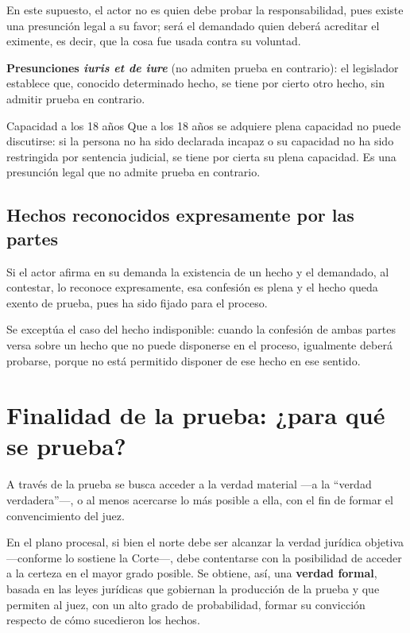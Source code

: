\documentclass[12pt,oneside]{book}
\begin{document}
En este supuesto, el actor no es quien debe probar la responsabilidad, pues existe una presunción legal a su favor; será el demandado quien deberá acreditar el eximente, es decir, que la cosa fue usada contra su voluntad.

\textbf{Presunciones \textit{iuris et de iure}} (no admiten prueba en contrario): el legislador establece que, conocido determinado hecho, se tiene por cierto otro hecho, sin admitir prueba en contrario.

\begin{example}{Capacidad a los 18 años}
Que a los 18 años se adquiere plena capacidad no puede discutirse: si la persona no ha sido declarada incapaz o su capacidad no ha sido restringida por sentencia judicial, se tiene por cierta su plena capacidad. Es una presunción legal que no admite prueba en contrario.
\end{example}

\subsection{Hechos reconocidos expresamente por las partes}

Si el actor afirma en su demanda la existencia de un hecho y el demandado, al contestar, lo reconoce expresamente, esa confesión es plena y el hecho queda exento de prueba, pues ha sido fijado para el proceso.

\begin{note}
Se exceptúa el caso del hecho indisponible: cuando la confesión de ambas partes versa sobre un hecho que no puede disponerse en el proceso, igualmente deberá probarse, porque no está permitido disponer de ese hecho en ese sentido.
\end{note}

\section{Finalidad de la prueba: ¿para qué se prueba?}

A través de la prueba se busca acceder a la verdad material —a la ``verdad verdadera''—, o al menos acercarse lo más posible a ella, con el fin de formar el convencimiento del juez.

En el plano procesal, si bien el norte debe ser alcanzar la verdad jurídica objetiva —conforme lo sostiene la Corte—, debe contentarse con la posibilidad de acceder a la certeza en el mayor grado posible. Se obtiene, así, una \textbf{verdad formal}, basada en las leyes jurídicas que gobiernan la producción de la prueba y que permiten al juez, con un alto grado de probabilidad, formar su convicción respecto de cómo sucedieron los hechos.
\end{document}
